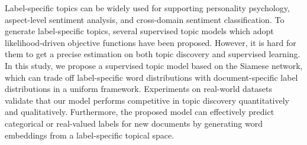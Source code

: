 Label-specific topics can be widely used for supporting personality psychology, aspect-level sentiment analysis, and cross-domain sentiment classification. To generate label-specific topics, several supervised topic models which adopt likelihood-driven objective functions have been proposed. However, it is hard for them to get a precise estimation on both topic discovery and supervised learning. In this study, we propose a supervised topic model based on the Siamese network, which can trade off label-specific word distributions with document-specific label distributions in a uniform framework. Experiments on real-world datasets validate that our model performs competitive in topic discovery quantitatively and qualitatively. Furthermore, the proposed model can effectively predict categorical or real-valued labels for new documents by generating word embeddings from a label-specific topical space.
